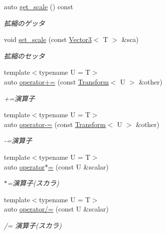\begin{DoxyCompactItemize}
auto \mbox{\hyperlink{classsaki_1_1_transform_a0ec8a9193bf5b987a72ed732b8976cfb}{get\+\_\+scale}} () const
\begin{DoxyCompactList}\small\item\em 拡縮のゲッタ \end{DoxyCompactList}\item 
void \mbox{\hyperlink{classsaki_1_1_transform_aade1855d64e42635e8b613aa055aa6fc}{set\+\_\+scale}} (const \mbox{\hyperlink{classsaki_1_1_vector3}{Vector3}}$<$ T $>$ \&sca)
\begin{DoxyCompactList}\small\item\em 拡縮のセッタ \end{DoxyCompactList}\item 
{\footnotesize template$<$typename U  = T$>$ }\\auto \mbox{\hyperlink{classsaki_1_1_transform_ae61e16c754492653881275f3942efb29}{operator+=}} (const \mbox{\hyperlink{classsaki_1_1_transform}{Transform}}$<$ U $>$ \&other)
\begin{DoxyCompactList}\small\item\em +=演算子 \end{DoxyCompactList}\item 
{\footnotesize template$<$typename U  = T$>$ }\\auto \mbox{\hyperlink{classsaki_1_1_transform_a27f9b6f3571fb0a44ca36ef51080a1d3}{operator-\/=}} (const \mbox{\hyperlink{classsaki_1_1_transform}{Transform}}$<$ U $>$ \&other)
\begin{DoxyCompactList}\small\item\em -\/=演算子 \end{DoxyCompactList}\item 
{\footnotesize template$<$typename U  = T$>$ }\\auto \mbox{\hyperlink{classsaki_1_1_transform_ab8df7cf8619c1f245d871e4e7627bf78}{operator$\ast$=}} (const U \&scalar)
\begin{DoxyCompactList}\small\item\em $\ast$=演算子(スカラ) \end{DoxyCompactList}\item 
{\footnotesize template$<$typename U  = T$>$ }\\auto \mbox{\hyperlink{classsaki_1_1_transform_a9a5559fdf626c8ecec063db74c6f4f8e}{operator/=}} (const U \&scalar)
\begin{DoxyCompactList}\small\item\em /= 演算子(スカラ) \end{DoxyCompactList}\item 

\end{DoxyCompactItemize}
